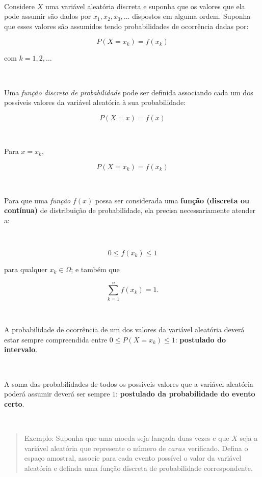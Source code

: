 \documentclass[
]{book}
\begin{document}
~

Considere \(X\) uma variável aleatória discreta e suponha que os valores que ela pode assumir são dados por \(x_{1},x_{2},x_{3}, \dots\) dispostos em alguma ordem. Suponha que esses valores são assumidos tendo probabilidades de ocorrência dadas por:

\hfill\break

\[
P (X=x_{k}) = f(x_{k})
\]

\hfill\break

com \(k=1, 2, \dots\)

~

Uma \emph{função discreta de probabilidade} pode ser definida associando cada um dos possíveis valores da variável aleatória à sua probabilidade:

\hfill\break
\[
P (X=x) = f(x)
\]

~

Para \(x = x_{k}\),

\[
P (X=x_{k}) = f(x_{k})
\]

~

Para que uma \emph{função} \(f(x)\) possa ser considerada uma \textbf{função (discreta ou contínua)} de distribuição de probabilidade, ela precisa necessariamente atender a:

~

\[
0 \leq f(x_{k}) \leq 1
\]

para qualquer \(x_{k} \in \Omega\); e também que

\[
\sum _{k=1}^{n}f\left(x_{k}\right) = 1.
\]

~

A probabilidade de ocorrência de um dos valores da variável aleatória deverá estar sempre compreendida entre \(0 \leq P(X = x_{k}) \leq 1\): \textbf{postulado do intervalo}.

~

A soma das probabilidades de todos os possíveis valores que a variável aleatória poderá assumir deverá ser sempre \(1\): \textbf{postulado da probabilidade do evento certo}.

~

\begin{quote}
Exemplo: Suponha que uma moeda seja lançada duas vezes e que \(X\) seja a variável aleatória que represente o número de \(caras\) verificado. Defina o espaço amostral, associe para cada evento possível o valor da variável aleatória e definda uma função discreta de probabilidade correspondente.
\end{quote}
\end{document}
